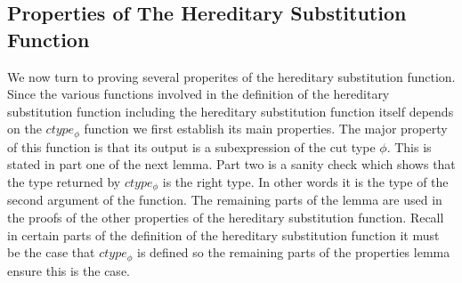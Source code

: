 \subsection{Properties of The Hereditary Substitution Function}
\label{sec:properties_of_the_hereditary_substitution_function_ssfp}
We now turn to proving several properites of the hereditary
substitution function.  Since the various functions involved in the
definition of the hereditary substitution function including the
hereditary substitution function itself depends on the $ctype_\phi$
function we first establish its main properties.  The major property of
this function is that its output is a subexpression of
the cut type $\phi$.  This is stated in part one of the next lemma.
Part two is a sanity check which shows that the type
returned by $ctype_\phi$ is the right type.  In other words it is the
type of the second argument of the function.  The remaining parts of
the lemma are used in the proofs of the other properties of the
hereditary substitution function.  Recall in certain parts of the
definition of the hereditary substitution function it must be the case
that $ctype_\phi$ is defined so the remaining parts of the properties
lemma ensure this is the case.

